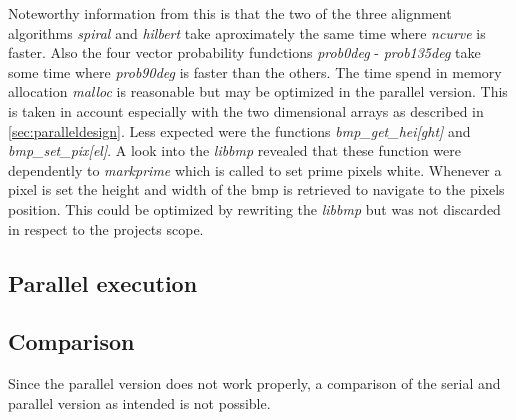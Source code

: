 Noteworthy information from this is that the two of the three alignment algorithms \emph{spiral} and \emph{hilbert} take aproximately the same time where \emph{ncurve} is faster. Also the four vector probability fundctions \emph{prob0deg} - \emph{prob135deg} take some time where \emph{prob90deg} is faster than the others. The time spend in memory allocation \emph{malloc} is reasonable but may be optimized in the parallel version. This is taken in account especially with the two dimensional arrays as described in \ref{sec:paralleldesign}.
Less expected were the functions \emph{bmp\_get\_hei[ght]} and \emph{bmp\_set\_pix[el]}. A look into the \emph{libbmp} revealed that these function were dependently to \emph{markprime} which is called to set prime pixels white. Whenever a pixel is set the height and width of the bmp is retrieved to navigate to the pixels position. This could be optimized by rewriting the \emph{libbmp} but was not discarded in respect to the projects scope.

\subsection{Parallel execution}
\label{sec:par_ex}

\subsection{Comparison}
Since the parallel version does not work properly, a comparison of the serial and parallel version as intended is not possible.




